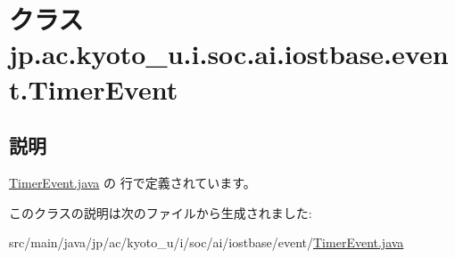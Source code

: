 \hypertarget{classjp_1_1ac_1_1kyoto__u_1_1i_1_1soc_1_1ai_1_1iostbase_1_1event_1_1_timer_event}{\section{クラス jp.\-ac.\-kyoto\-\_\-u.\-i.\-soc.\-ai.\-iostbase.\-event.\-Timer\-Event}
\label{classjp_1_1ac_1_1kyoto__u_1_1i_1_1soc_1_1ai_1_1iostbase_1_1event_1_1_timer_event}
}


\subsection{説明}


 \hyperlink{_timer_event_8java_source}{Timer\-Event.\-java} の  行で定義されています。



このクラスの説明は次のファイルから生成されました\-:\begin{DoxyCompactItemize}
\item 
src/main/java/jp/ac/kyoto\-\_\-u/i/soc/ai/iostbase/event/\hyperlink{_timer_event_8java}{Timer\-Event.\-java}\end{DoxyCompactItemize}

